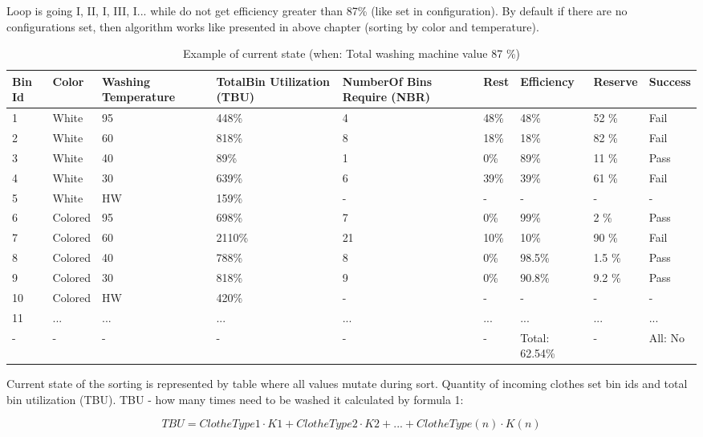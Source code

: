 Loop is going I, II, I, III, I... while do not get efficiency greater than 87\% (like set in configuration). By default if there are no configurations set, then algorithm works like presented in above chapter (sorting by color and temperature).

\begin{table}[h]
	
    \begin{tabular}{ | p{0.4cm} | p{1cm} | p{2cm} | p{1.7cm} |p{2cm} |p{1cm} |p{1.3cm} |p{1.2cm} |p{1.3cm} |}
    \hline
	Bin Id & Color & Washing Temperature & TotalBin Utilization (TBU) & NumberOf Bins Require (NBR) & Rest & Efficiency & Reserve & Success\\ \hline
	1 & White & 95 & 448\% & 4 & 48\% & 48\% & 52 \% & Fail \\ \hline
	2 & White & 60 & 818\% & 8 & 18\% & 18\% & 82 \% & Fail \\ \hline
	3 & White & 40 & 89\% & 1 & 0\% & 89\% & 11 \% & Pass \\ \hline
	4 & White & 30 & 639\% & 6 & 39\% & 39\% & 61 \% & Fail \\ \hline
	5 & White & HW & 159\% & - & - & - & - & - \\ \hline
	6 & Colored & 95 & 698\% & 7 & 0\% & 99\% & 2 \% & Pass \\ \hline
	7 & Colored & 60 & 2110\% & 21 & 10\% & 10\% & 90 \% & Fail \\ \hline
	8 & Colored & 40 & 788\% & 8 & 0\% & 98.5\% & 1.5 \% & Pass \\ \hline
	9 & Colored & 30 & 818\% & 9 & 0\% & 90.8\% & 9.2 \% & Pass \\ \hline
	10 & Colored & HW & 420\% & - & - & - & - & - \\ \hline
	11 & ... & ... & ... & ... & ... & ... & ... & ... \\ \hline
	- & - & - & - & - & - & Total: 62.54\% & - & All: No \\ \hline
    \end{tabular}
	\caption{Example of current state (when: Total washing machine value 87 \%)}
	\label{tab:currentState}
\end{table}

\newpage
Current state of the sorting is represented by table where all values mutate during sort. Quantity of incoming clothes set bin ids and total bin utilization (TBU). TBU - how many times need to be washed it calculated by formula 1:

\begin{equation}
TBU=ClotheType1\cdot K1+ClotheType2\cdot K2+...+ClotheType(n)\cdot K(n) \label{eq:eq1}
\end{equation}


